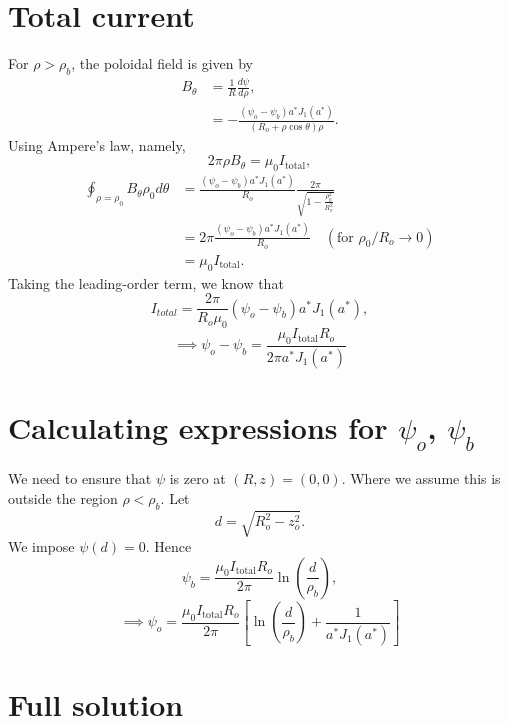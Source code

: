 \documentclass{article}
\begin{document}
\section{Total current}

For $\rho>\rho_b$, the poloidal field is given by
\[\begin{aligned}
B_\theta &= \frac{1}{R}\frac{d\psi}{d\rho}, \\
&= -\frac{(\psi_o-\psi_b)a^*J_1(a^*)}{(R_o+\rho\cos\theta)\rho}.
\end{aligned}\]
Using Ampere's law, namely,
\[2\pi\rho B_\theta = \mu_0 I_\text{total},\]
\[\begin{aligned}
\oint_{\rho=\rho_0}B_\theta \rho_0d\theta &= \frac{(\psi_o-\psi_b)a^*J_1(a^*)}{R_o}\frac{2\pi}{\sqrt{1-\frac{\rho_0^2}{R_o^2}}}\\
&= 2\pi\frac{(\psi_o-\psi_b)a^*J_1(a^*)}{R_o}\quad (\text{for } \rho_0/R_o\rightarrow0)  \\
&=\mu_0 I_\text{total}.
\end{aligned}\]
Taking the leading-order term, we know that
\[I_{total} = \frac{2\pi}{R_o\mu_0}(\psi_o-\psi_b)a^*J_1(a^*),\]
\[\implies \psi_o-\psi_b = \frac{\mu_0I_\text{total} R_o}{2\pi a^*J_1(a^*)}\]

\section{Calculating expressions for $\psi_o$, $\psi_b$}

We need to ensure that $\psi$ is zero at $(R, z) = (0,0)$. Where we assume this is outside the region $\rho<\rho_b$.
Let
\[d = \sqrt{R_o^2-z_o^2}.\]
We impose $\psi(d) = 0$. Hence
\[\psi_b = \frac{\mu_0I_\text{total}R_o}{2\pi}\ln\left(\frac{d}{\rho_b}\right),\]
\[\implies \psi_o = \frac{\mu_0I_\text{total}R_o}{2\pi}\left[\ln\left(\frac{d}{\rho_b}\right)+\frac{1}{a^*J_1(a^*)}\right]\]

\section{Full solution}
\end{document}
